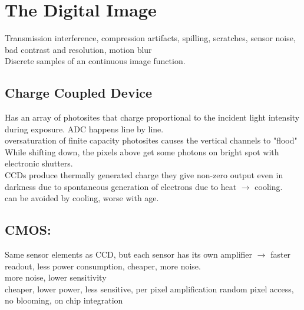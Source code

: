 

\section{The Digital Image}
 Transmission interference, compression artifacts, spilling, scratches, sensor noise, bad contrast and resolution, motion blur \\
 Discrete samples of an continuous image function.
\subsection*{Charge Coupled Device }
Has an array of photosites  that charge proportional to the incident light intensity during exposure. ADC happens line by line. \\
 oversaturation of finite capacity photosites causes the vertical channels to "flood" \\
 While shifting down, the pixels above get some photons on bright spot with electronic shutters.\\
 CCDs produce thermally generated charge they give non-zero output even in darkness  due to spontaneous generation of electrons due to heat $\rightarrow$ cooling.\\ can be avoided by cooling, worse with age.
\subsection*{CMOS:}
Same sensor elements as CCD, but each sensor has its own amplifier $\rightarrow$ faster readout, less power consumption, cheaper, more noise.\\ more noise, lower sensitivity\\
 cheaper, lower power, less sensitive, per pixel amplification random pixel access, no blooming, on chip integration
